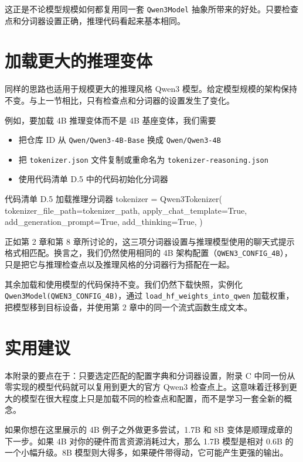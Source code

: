 这正是不论模型规模如何都复用同一套 \texttt{Qwen3Model} 抽象所带来的好处。只要检查点和分词器设置正确，推理代码看起来基本相同。

\section{加载更大的推理变体}

同样的思路也适用于规模更大的推理风格 Qwen3 模型。给定模型规模的架构保持不变。与上一节相比，只有检查点和分词器的设置发生了变化。

例如，要加载 4B 推理变体而不是 4B 基座变体，我们需要

\begin{itemize}
\item 把仓库 ID 从 \texttt{Qwen/Qwen3-4B-Base} 换成 \texttt{Qwen/Qwen3-4B}
\item 把 \texttt{tokenizer.json} 文件复制或重命名为 \texttt{tokenizer-reasoning.json}
\item 使用代码清单 D.5 中的代码初始化分词器
\end{itemize}

\begin{codeboxt}{代码清单 D.5 加载推理分词器}
tokenizer = Qwen3Tokenizer(
    tokenizer_file_path=tokenizer_path,
    apply_chat_template=True,
    add_generation_prompt=True,
    add_thinking=True,
)
\end{codeboxt}

正如第 2 章和第 8 章所讨论的，这三项分词器设置与推理模型使用的聊天式提示格式相匹配。换言之，我们仍然使用相同的 4B 架构配置（\texttt{QWEN3\_CONFIG\_4B}），只是把它与推理检查点以及推理风格的分词器行为搭配在一起。

其余加载和使用模型的代码保持不变。我们仍然下载快照，实例化 \texttt{Qwen3Model(QWEN3\_CONFIG\_4B)}，通过 \texttt{load\_hf\_weights\_into\_qwen} 加载权重，把模型移到目标设备，并使用第 2 章中的同一个流式函数生成文本。

\section{实用建议}

本附录的要点在于：只要选定匹配的配置字典和分词器设置，附录 C 中同一份从零实现的模型代码就可以复用到更大的官方 Qwen3 检查点上。这意味着迁移到更大的模型在很大程度上只是加载不同的检查点和配置，而不是学习一套全新的概念。

如果你想在这里展示的 4B 例子之外做更多尝试，1.7B 和 8B 变体是顺理成章的下一步。如果 4B 对你的硬件而言资源消耗过大，那么 1.7B 模型是相对 0.6B 的一个小幅升级。8B 模型则大得多，如果硬件带得动，它可能产生更强的输出。
